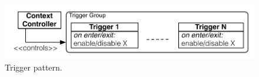 \begin{figure}[tb]
\begin{center}
\includegraphics[scale=.5]{imgs/con_act}
\vspace{-2mm}
\caption{Trigger pattern.}
  \label{fig:trigger}
\vspace{-8mm}
\end{center}
\end{figure}


